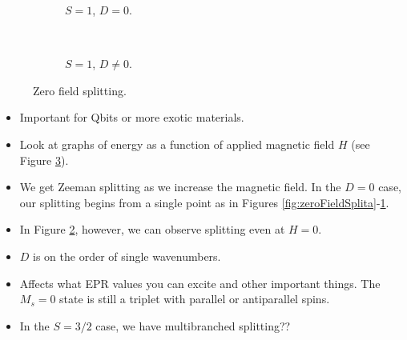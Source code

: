 \documentclass[../notes.tex]{subfiles}
\begin{document}
\begin{itemize}
\begin{figure}[h!]
\begin{subfigure}[b]{0.49\linewidth}
            \caption{$S=1$, $D=0$.}
            \label{fig:zeroFieldSplitb}
        \end{subfigure}\\[1em]
        \begin{subfigure}[b]{0.49\linewidth}
            \centering
            \caption{$S=1$, $D\neq 0$.}
            \label{fig:zeroFieldSplitc}
        \end{subfigure}
        \caption{Zero field splitting.}
        \label{fig:zeroFieldSplit}
    \end{figure}
    \begin{itemize}
        \item Important for Qbits or more exotic materials.
        \item Look at graphs of energy as a function of applied magnetic field $H$ (see Figure \ref{fig:zeroFieldSplit}).
        \item We get Zeeman splitting as we increase the magnetic field. In the $D=0$ case, our splitting begins from a single point as in Figures \ref{fig:zeroFieldSplita}-\ref{fig:zeroFieldSplitb}.
        \item In Figure \ref{fig:zeroFieldSplitc}, however, we can observe splitting even at $H=0$.
        \item $D$ is on the order of single wavenumbers.
        \item Affects what EPR values you can excite and other important things. The $M_s=0$ state is still a triplet with parallel or antiparallel spins.
        \item In the $S=3/2$ case, we have multibranched splitting??
    \end{itemize}
\end{itemize}
\end{document}
